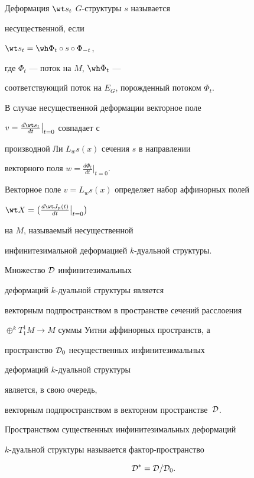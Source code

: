 \begin{defn}


Деформация $\wt s_t$\; $G$-структуры $s$ называется


несущественной, если


$\wt s_t=\wh \Phi_t \circ s \circ \Phi_{-t}$,


где $\Phi_t$ --- поток на $M$, $\wh \Phi_t$ ---


соответствующий поток на $E_G$, порожденный потоком $\Phi_t$.


В случае несущественной деформации векторное поле


$v=\frac{d \wt s_t}{dt}\big|_{t=0}$ совпадает с


производной Ли $L_ws(x)$ сечения $s$ в направлении


векторного поля $w=\frac{d\Phi_t}{dt}\big|_{t=0}$.


\end{defn}





\begin{defn}


Векторное поле $v=L_ws(x)$ определяет набор аффинорных полей


$\wt X =\big(\frac{d\wt J_p(t)}{dt} \big|_{t=0} \big)$


на $M$, называемый несущественной


инфинитезимальной деформацией $k$-дуальной структуры.


\end{defn}





Множество ${\cal D}$ инфинитезимальных


деформаций $k$-дуальной структуры является


векторным подпространством в пространстве сечений расслоения 


$\oplus^k T^1_1M\to M$ суммы Уитни аффинорных пространств, а


пространство ${\cal D}_0 $ несущественных инфинитезимальных


деформаций $k$-дуальной структуры


является, в свою очередь,


векторным подпространством в векторном пространстве~${\cal D}$.





\begin{defn}


Пространством существенных инфинитезимальных деформаций


$k$-ду\-аль\-ной структуры называется фактор-пространство


$$


{\cal D}^{\ast}={\cal D}/ {\cal D}_0.


$$


\end{defn}





